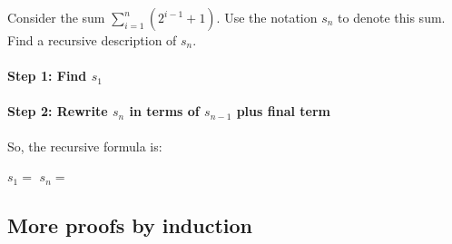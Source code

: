         \begin{questionNOGRADE}{\thequestion}

            Consider the sum $\sum_{i=1}^{n} (2^{i-1}+1)$. Use the notation
            $s_{n}$ to denote this sum. Find a recursive description of $s_{n}$.

            \paragraph{Step 1: Find $s_{1}$}


            \paragraph{Step 2: Rewrite $s_{n}$ in terms of $s_{n-1}$ plus final term}
            

            So, the recursive formula is:

            \begin{framed}
                $s_{1} = $ 
                \tab[4cm]
                $s_{n} = $ 
            \end{framed}
            
        \end{questionNOGRADE}

        \subsection{More proofs by induction}

